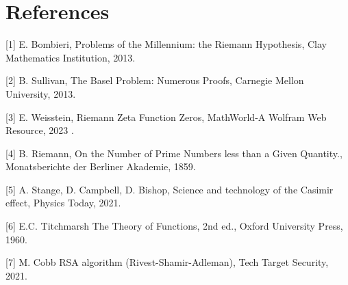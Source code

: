 \documentclass[10pt]{article}
\begin{document}
\section*{References}
[1] E. Bombieri, Problems of the Millennium: the Riemann Hypothesis, Clay Mathematics Institution, 2013.

[2] B. Sullivan, The Basel Problem: Numerous Proofs, Carnegie Mellon University, 2013.

[3] E. Weisstein, Riemann Zeta Function Zeros, MathWorld-A Wolfram Web Resource, 2023 .

[4] B. Riemann, On the Number of Prime Numbers less than a Given Quantity., Monatsberichte der Berliner Akademie, 1859.

[5] A. Stange, D. Campbell, D. Bishop, Science and technology of the Casimir effect, Physics Today, 2021.

[6] E.C. Titchmarsh The Theory of Functions, 2nd ed., Oxford University Press, 1960.

[7] M. Cobb RSA algorithm (Rivest-Shamir-Adleman), Tech Target Security, 2021.
\end{document}
